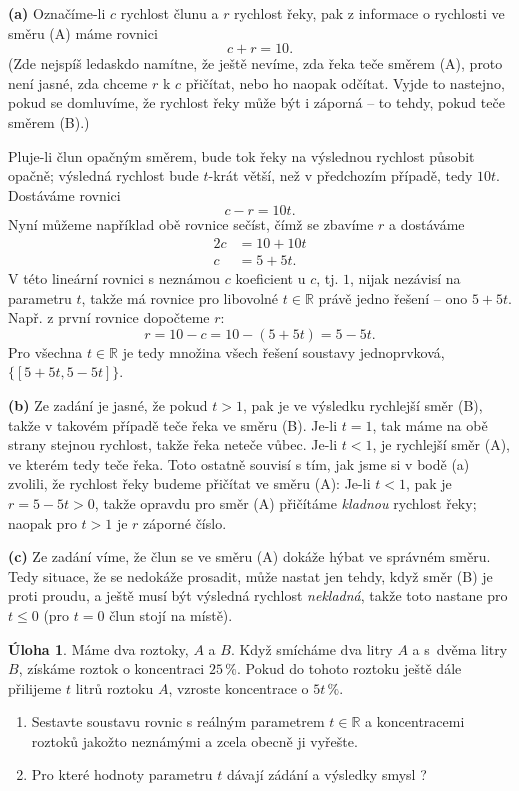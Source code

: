 \documentclass[12pt,a4paper]{article}
\newcommand{\R}{\mathbb{R}}
\theoremstyle{definition}
\newtheorem{uloha}{Úloha}
\newenvironment{res}{\proof}{\endproof}
\begin{document}
\begin{res}
\textbf{(a)}
Označíme-li $c$ rychlost člunu a $r$ rychlost řeky, pak z informace o rychlosti ve směru (A) máme rovnici
\[ c + r = 10. \]
(Zde nejspíš ledaskdo namítne, že ještě nevíme, zda řeka teče směrem (A), proto není jasné, zda chceme $r$ k $c$ přičítat, nebo ho naopak odčítat. Vyjde to nastejno, pokud se domluvíme, že rychlost řeky může být i záporná -- to tehdy, pokud teče směrem (B).)

Pluje-li člun opačným směrem, bude tok řeky na výslednou rychlost působit opačně; výsledná rychlost bude $t$-krát větší, než v předchozím případě, tedy $10t$. Dostáváme rovnici
\[ c - r = 10t. \]
Nyní můžeme například obě rovnice sečíst, čímž se zbavíme $r$ a dostáváme
\begin{align*}
2c &= 10 + 10t \\
c &= 5 + 5t.
\end{align*}
V této lineární rovnici s neznámou $c$ koeficient u $c$, tj. $1$, nijak nezávisí na parametru $t$, takže má rovnice pro libovolné $t \in \R$ právě jedno řešení -- ono $5 + 5t$. Např. z první rovnice dopočteme $r$:
\[ r = 10 - c = 10 - (5 + 5t) = 5 - 5t. \]
Pro všechna $t \in \R$ je tedy množina všech řešení soustavy jednoprvková, $\{[5 + 5t, 5 - 5t]\}$.

\medskip
\noindent\textbf{(b)}
Ze zadání je jasné, že pokud $t > 1$, pak je ve výsledku rychlejší směr (B), takže v takovém případě teče řeka ve směru (B). Je-li $t = 1$, tak máme na obě strany stejnou rychlost, takže řeka neteče vůbec. Je-li $t < 1$, je rychlejší směr (A), ve kterém tedy teče řeka. Toto ostatně souvisí s tím, jak jsme si v bodě (a) zvolili, že rychlost řeky budeme přičítat ve směru (A): Je-li $t < 1$, pak je $r = 5 - 5t > 0$, takže opravdu pro směr (A) přičítáme \emph{kladnou} rychlost řeky; naopak pro $t > 1$ je $r$ záporné číslo.

\medskip
\noindent\textbf{(c)}
Ze zadání víme, že člun se ve směru (A) dokáže hýbat ve správném směru. Tedy situace, že se nedokáže prosadit, může nastat jen tehdy, když směr (B) je proti proudu, a ještě musí být výsledná rychlost \emph{nekladná}, takže toto nastane pro $t \leq 0$ (pro $t = 0$ člun stojí na místě).
\end{res}




\begin{uloha}
Máme dva roztoky, $A$ a $B$. Když smícháme dva litry $A$ a s~dvěma litry $B$, získáme roztok o koncentraci $25\,\%$. Pokud do tohoto roztoku ještě dále přilijeme $t$ litrů roztoku $A$, vzroste koncentrace o $5t\,\%$.
\begin{enumerate}
	\item Sestavte soustavu rovnic s reálným parametrem $t \in \R$ a koncentracemi roztoků jakožto neznámými a zcela obecně ji vyřešte.
	\item Pro které hodnoty parametru $t$ dávají zádání a výsledky smysl ?
\end{enumerate}
\end{uloha}
\end{document}
